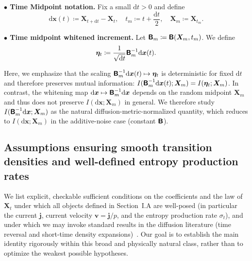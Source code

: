 \bigskip
\noindent\textbf{$\bullet$ Time Midpoint notation.} Fix a small $\mathrm{d}t>0$ and define
\begin{equation}
    \mathrm{d}\bm{x}(t)\coloneq\bm{X}_{t+\mathrm{d}t}-\bm{X}_t,
    \quad
    t_m\coloneq t+\frac{\mathrm{d}t}{2},
    \quad
    \bm{X}_m\coloneq\bm{X}_{t_m}.
    \label{seq:midpoint_notation}
\end{equation}

\noindent\textbf{$\bullet$ Time midpoint whitened increment.} Let $\boldsymbol{\mathsf{B}}_m\coloneq\boldsymbol{\mathsf{B}}(\bm{X}_m,t_m)$. We define
\begin{equation}
    \bm{\eta}_t\coloneq\frac{1}{\sqrt{\mathrm{d}t}}\boldsymbol{\mathsf{B}}_m^{-1}\mathrm{d}\bm{x}(t).
    \label{seq:def_Binv_dx}
\end{equation}

Here, we emphasize that the scaling $\boldsymbol{\mathsf{B}}_m^{-1}\mathrm{d}\bm{x}(t)\mapsto\bm{\eta}_t$ is deterministic for fixed $\mathrm{d}t$ and therefore preserves mutual information: $I(\boldsymbol{\mathsf{B}}_m^{-1}\mathrm{d}\bm{x}(t);\bm{X}_m)=I(\bm{\eta}_t;\bm{X}_m)$. In contrast, the whitening map $\mathrm{d}\bm{x}\mapsto\boldsymbol{\mathsf{B}}_m^{-1}\mathrm{d}\bm{x}$ depends on the random midpoint $\bm{X}_m$ and thus does not preserve $I(\mathrm{d}\bm{x};\bm{X}_m)$ in general. We therefore study $I(\boldsymbol{\mathsf{B}}_m^{-1}\mathrm{d}\bm{x};\bm{X}_m)$ as the natural diffusion-metric-normalized quantity, which reduces to $I(\mathrm{d}\bm{x};\bm{X}_m)$ in the additive-noise case (constant $\boldsymbol{\mathsf{B}}$).

\subsection{Assumptions ensuring smooth transition densities and well-defined entropy production rates}
\vspace*{-0.8\baselineskip}
We list explicit, checkable sufficient conditions on the coefficients and the law of $\bm{X}_t$ under which all objects defined in Section~I.A are well-posed (in particular the current $\bm{j}$, current velocity $\bm{v}=\bm{j}/p$, and the entropy production rate $\sigma_t$), and under which we may invoke standard results in the diffusion literature (time reversal and short-time density expansions)~\cite{anderson1982reverse,haussmann1986time,li2013maximum,watanabe1987analysis,yang2019anew,kloeden1992numerical,maruyama1955continuous,yoshida1992asymptotic,higa2013estimates,bally2015probabilistic}. Our goal is to establish the main identity rigorously within this broad and physically natural class, rather than to optimize the weakest possible hypotheses.

